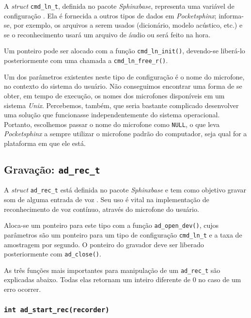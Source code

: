 A \textit{struct} \texttt{cmd\_ln\_t}, definida no pacote \textit{Sphinxbase}, representa uma variável de configuração \citep{pocketsphinxInstallUse}. Ela é fornecida a outros tipos de dados em \textit{Pocketsphinx}; informa-se, por exemplo, os arquivos a serem usados (dicionário, modelo acústico, etc.) e se o reconhecimento usará um arquivo de áudio ou será feito na hora.

Um ponteiro pode ser alocado com a função \texttt{cmd\_ln\_init()}, devendo-se liberá-lo posteriormente com uma chamada a \texttt{cmd\_ln\_free\_r()}.

Um dos parâmetros existentes neste tipo de configuração é o nome do microfone, no contexto do sistema do usuário. Não conseguimos encontrar uma forma de se obter, em tempo de execução, os nomes dos microfones disponíveis em um sistema \textit{Unix}. Percebemos, também, que seria bastante complicado desenvolver uma solução que funcionasse independentemente do sistema operacional. Portanto, escolhemos passar o nome do microfone como \texttt{NULL}, o que leva \textit{Pocketsphinx} a sempre utilizar o microfone padrão do computador, seja qual for a plataforma em que ele está.


\subsection{Gravação: \texttt{ad\_rec\_t}}

A \textit{struct} \texttt{ad\_rec\_t} está definida no pacote \textit{Sphinxbase} e tem como objetivo gravar som de alguma entrada de voz \citep{pocketsphinxInstallUse}. Seu uso é vital na implementação de reconhecimento de voz contínuo, através do microfone do usuário.

Aloca-se um ponteiro para este tipo com a função \texttt{ad\_open\_dev()}, cujos parâmetros são um ponteiro para um tipo de configuração \texttt{cmd\_ln\_t} e a taxa de amostragem por segundo. O ponteiro do gravador deve ser liberado posteriormente  com \texttt{ad\_close()}.

As três funções mais importantes para manipulação de um \texttt{ad\_rec\_t} são explicadas abaixo. Todas elas retornam um inteiro diferente de 0 no caso de um erro ocorrer.

\subsubsection{\texttt{int ad\_start\_rec(recorder)}}

